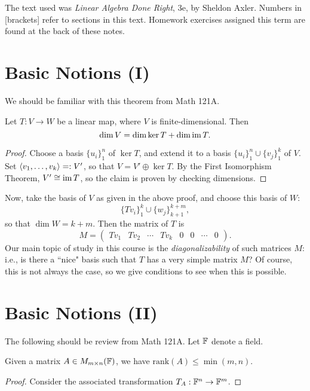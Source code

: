 \documentclass{article}
\begin{document}
The text used was \textit{Linear Algebra Done Right}, 3e, by Sheldon Axler. Numbers in [brackets] refer to sections in this text. Homework exercises assigned this term are found at the back of these notes.

\section{Basic Notions (I)}
We should be familiar with this theorem from Math 121A.
\begin{theorem}
Let $T: V\to W$ be a linear map, where $V$ is finite-dimensional. Then
$$\dim V = \dim\ker T + \dim\operatorname{im} T.$$
\end{theorem}
\begin{proof}
Choose a basis $\{u_i\}_1^n$ of $\ker T$, and extend it to a basis $\{u_i\}_1^n \cup \{v_j\}_1^k$ of $V$. Set $\left\langle v_1, \ldots, v_k\right\rangle =: V'$, so that $V = V' \oplus \ker T$. By the First Isomorphism Theorem, $V' \cong \operatorname{im} T$, so the claim is proven by checking dimensions.
\end{proof}
Now, take the basis of $V$ as given in the above proof, and choose this basis of $W$:
$$\{Tv_i\}_1^k \cup \{w_j\}_{k+1}^{k+m},$$
so that $\dim W = k+m$. Then the matrix of $T$ is
$$M = \begin{pmatrix}
    Tv_1 & Tv_2 & \cdots & Tv_k & 0 & 0 & \cdots & 0
\end{pmatrix}.$$
Our main topic of study in this course is the \textit{diagonalizability} of such matrices $M$: i.e., is there a ``nice" basis such that $T$ has a very simple matrix $M$? Of course, this is not always the case, so we give conditions to see when this is possible.
\section{Basic Notions (II)}
The following should be review from Math 121A. Let $\mathbb F$ denote a field.
\begin{proposition}
Given a matrix $A\in M_{m\times n}(\mathbb F)$, we have $\mathrm{rank}(A) \leq \min(m, n)$.
\end{proposition}
\begin{proof}
Consider the associated transformation $T_A: \mathbb F^n \to \mathbb F^m$.
\end{proof}
\end{document}
